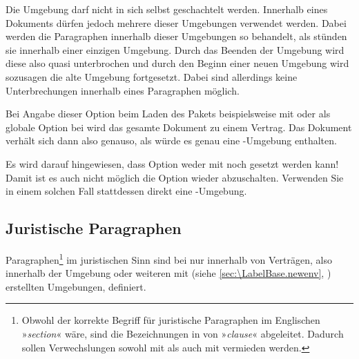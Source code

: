 Die Umgebung  darf nicht in sich
selbst geschachtelt werden. Innerhalb eines Dokuments dürfen jedoch mehrere
dieser Umgebungen verwendet werden. Dabei werden die Paragraphen innerhalb
dieser Umgebungen so behandelt, als stünden sie innerhalb einer einzigen
Umgebung. Durch das Beenden der Umgebung wird diese also quasi
unterbrochen und durch den Beginn einer neuen Umgebung wird sozusagen die alte
Umgebung fortgesetzt. Dabei sind allerdings keine Unterbrechungen innerhalb
eines Paragraphen möglich.%
\EndIndexGroup

\begin{Declaration}
\end{Declaration}
Bei Angabe dieser Option beim Laden des Pakets beispielsweise mit
%
 oder als globale Option bei
%
 wird das gesamte Dokument
zu einem Vertrag. Das Dokument verhält sich dann also genauso, als würde es
genau eine -Umgebung enthalten.

Es wird darauf hingewiesen, dass Option 
weder mit  noch
 gesetzt werden kann!  Damit ist es auch
nicht möglich die Option wieder abzuschalten. Verwenden Sie in einem solchen
Fall stattdessen direkt eine -Umgebung.
%
\EndIndexGroup


\subsection{Juristische Paragraphen}
\label{sec:scrjura.clause}
\BeginIndexGroup
{} 

Paragraphen\footnote{Obwohl der korrekte Begriff für juristische Paragraphen
  im Englischen »\emph{section}« wäre, sind die Bezeichnungen in
   von »\emph{clause}« abgeleitet. Dadurch sollen
  Verwechslungen sowohl mit  als auch mit
   vermieden werden.} im juristischen Sinn
sind bei  nur innerhalb von Verträgen, also innerhalb der
Umgebung  oder weiteren mit
 (siehe
\autoref{sec:\LabelBase.newenv},
) erstellten Umgebungen,
definiert.

